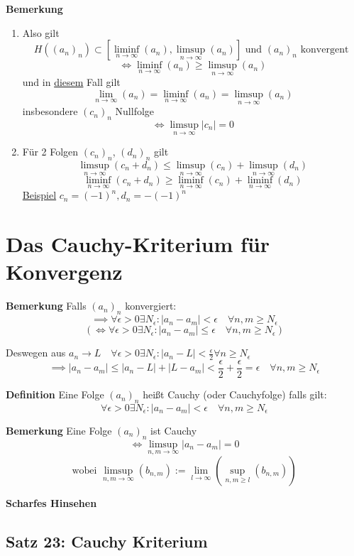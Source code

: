 \documentclass[fleqn]{scrbook}
\begin{document}
\textbf{Bemerkung}

\begin{enumerate}
  \item Also gilt
    \[H((a_n)_n) \subset [\liminf_{n \to \infty} (a_n),\limsup_{n \to \infty} (a_n)] \text{ und } (a_n)_n \text{ konvergent } \]
    \[\Longleftrightarrow \liminf_{n \to \infty} (a_n)\geq\limsup_{n \to \infty} (a_n)\]
    und in \underline{diesem} Fall gilt
    \[\lim_{n \to \infty} (a_n) = \liminf_{n \to \infty} (a_n) = \limsup_{n \to \infty} (a_n)\]
    insbesondere $(c_n)_n$ Nullfolge
    \[\Longleftrightarrow \limsup_{n \to \infty} |c_n| = 0\]
  \item Für 2 Folgen $(c_n)_n$, $(d_n)_n$ gilt
    \[\limsup_{n \to \infty}(c_n+d_n) \leq \limsup_{n \to \infty}(c_n)+\limsup_{n \to \infty}(d_n)\]
    \[\liminf_{n \to \infty}(c_n+d_n) \geq \liminf_{n \to \infty}(c_n)+\liminf_{n \to \infty}(d_n)\]
    \underline{Beispiel} $c_n=(-1)^n,d_n=-(-1)^n$
\end{enumerate}

\section{Das Cauchy-Kriterium für Konvergenz}

\textbf{Bemerkung} Falls $(a_n)_n$ konvergiert:
\[\implies \forall \epsilon > 0 \exists N_\epsilon: |a_n-a_m|<\epsilon \quad \forall n,m \geq N_\epsilon\]
\[(\Longleftrightarrow \forall \epsilon > 0 \exists N_\epsilon: |a_n-a_m|\leq \epsilon \quad \forall n,m \geq N_\epsilon)\]

Deswegen aus $a_n \to L \quad \forall \epsilon > 0 \exists N_\epsilon : |a_n-L|<\frac{\epsilon}{2} \forall n \geq N_\epsilon$
\[\implies |a_n-a_m| \leq |a_n-L|+|L-a_m| < \frac{\epsilon}{2} + \frac{\epsilon}{2} = \epsilon \quad \forall n,m \geq N_\epsilon\]

\textbf{Definition} Eine Folge $(a_n)_n$ heißt Cauchy (oder Cauchyfolge) falls gilt:
\[\forall \epsilon > 0 \exists N_\epsilon: |a_n-a_m|<\epsilon \quad \forall n,m \geq N_\epsilon\]

\textbf{Bemerkung} Eine Folge $(a_n)_n$ ist Cauchy
\[\Longleftrightarrow \limsup_{n,m\to \infty}|a_n-a_m|=0\]
\[\text{wobei } \limsup_{n,m\to \infty}(b_{n,m}):=\lim_{l \to \infty}(\sup_{n,m\geq l}(b_{n,m}))\]

\textbf{Scharfes Hinsehen}

\subsection{Satz 23: Cauchy Kriterium}
\end{document}
